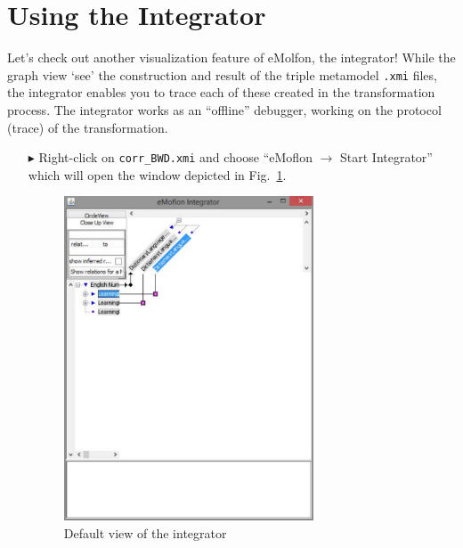 \newpage
\section{Using the Integrator}
\genHeader
\label{sec:app_integrator}


Let's check out another visualization feature of eMolfon, the integrator! While the graph view `see' the construction and result of the triple
metamodel \texttt{.xmi} files, the integrator enables you to trace each of these created in the transformation process. The integrator works as an ``offline''
debugger, working on the protocol (trace) of the transformation.

\begin{itemize}

\item[$\blacktriangleright$] Right-click on \texttt{corr\_BWD.xmi} and choose ``eMoflon $\rightarrow$ Start Integrator'' which will open the window depicted in
Fig.~\ref{fig:integrator_start}.

\begin{figure}[htbp]
\begin{center}
  \includegraphics[width=0.7\textwidth]{integrator_start_view.pdf}
  \caption{Default view of the integrator}
  \label{fig:integrator_start}
\end{center}
\end{figure}


\end{itemize}
